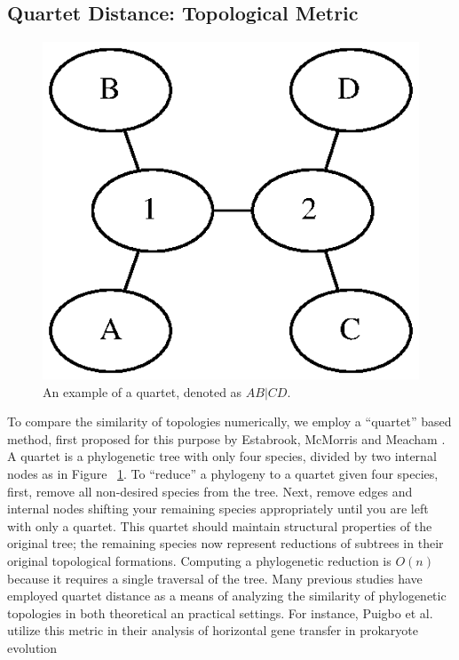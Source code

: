 \documentclass[10pt,twocolumn]{article}
\begin{document}
\subsection*{Quartet Distance: Topological Metric}
\begin{figure}
\begin{centering}
  \includegraphics{media//quartet.eps}
  \caption{An example of a quartet, denoted as $AB|CD$.}
  \label{fig:quartet}
\end{centering}
\end{figure}
To compare the similarity of topologies numerically, we employ a ``quartet'' based method, first proposed for this purpose by Estabrook, McMorris and Meacham \cite{estabrook1985comparison}. A quartet is a phylogenetic tree with only four species, divided by two internal nodes as in Figure ~\ref{fig:quartet}. To ``reduce'' a phylogeny to a quartet given four species, first, remove all non-desired species from the tree. Next, remove edges and internal nodes shifting your remaining species appropriately until you are left with only a quartet. This quartet should maintain structural properties of the original tree; the remaining species now represent reductions of subtrees in their original topological formations. Computing a phylogenetic reduction is $O(n)$ because it requires a single traversal of the tree. Many previous studies have employed quartet distance as a means of analyzing the similarity of phylogenetic topologies in both theoretical an practical settings. For instance, Puigbo et al. \cite{puigbo2010tree} utilize this metric in their analysis of horizontal gene transfer in prokaryote evolution
\end{document}
